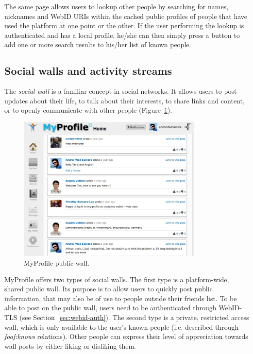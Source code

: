 The same page allows users to lookup other people by searching for names, nicknames and WebID URIs within the cached public profiles of people that have used the platform at one point or the other. If the user performing the lookup is authenticated and has a local profile, he/she can then simply press a button to add one or more search results to his/her list of known people.

\subsection{Social walls and activity streams}
The \textit{social wall} is a familiar concept in social networks. It allows users to post updates about their life, to talk about their interests, to share links and content, or to openly communicate with other people (Figure~\ref{fig:public_wall}).\\

\begin{figure}[h]
  \begin{center}
    \includegraphics[width=350px]{img/screens/public_wall.jpg}
        \caption{MyProfile public wall.}
        \label{fig:public_wall}
  \end{center}
\end{figure}

MyProfile offers two types of social walls. The first type is a platform-wide, shared public wall. Its purpose is to allow users to quickly post public information, that may also be of use to people outside their friends list. To be able to post on the public wall, users need to be authenticated through WebID-TLS (see Section~\ref{sec:webid-auth}). The second type is a private, restricted access wall, which is only available to the user's known people (i.e. described through \textit{foaf:knows} relations). Other people can express their level of appreciation towards wall posts by either liking or disliking them.\\

